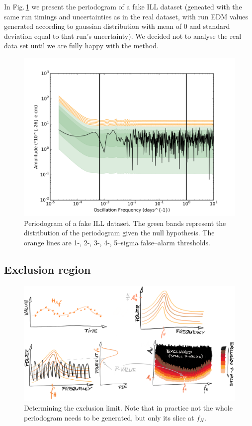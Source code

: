 In Fig.\,\ref{fig:ILL_detection} we present the periodogram of a fake ILL dataset (geneated with the same run timings and uncertainties as in the real dataset, with run EDM values generated according to gaussian distribution with mean of $0$ and standard deviation equal to that run's uncertainty). We decided not to analyse the real data set until we are fully happy with the method.

\begin{figure}[h!]
  \begin{center}
    \includegraphics[width=\columnwidth]{gfx/axions/ILL_detection_Periodogram.png}
    \caption{Periodogram of a fake ILL dataset. The green bands represent the distribution of the periodogram given the null hypothesis. The orange lines are 1-, 2-, 3-, 4-, 5--sigma false--alarm thresholds.}
    \label{fig:ILL_detection}
  \end{center}
\end{figure}



\subsection{Exclusion region}
\begin{figure}[htb]
  \centering \includegraphics[width=\linewidth]{gfx/axions/exclusion_region.png}
  \caption{Determining the exclusion limit. Note that in practice not the whole periodogram needs to be generated, but only its slice at $f_H$.}
  \label{fig:exclusion_region}
\end{figure}


